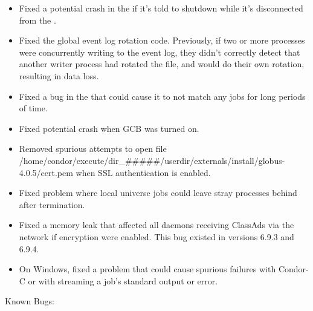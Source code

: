 \begin{itemize}
\item Fixed a potential crash in the  if it's told to
shutdown while it's disconnected from the .

\item Fixed the global event log rotation code.  Previously, if two or
  more processes were concurrently writing to the event log, they
  didn't correctly detect that another writer process had rotated the
  file, and would do their own rotation, resulting in data loss.

\item Fixed a bug in the  that could cause it to not match
any jobs for long periods of time.

\item Fixed potential crash when GCB was turned on.

\item Removed spurious attempts to open file
/home/condor/execute/dir\_\#\#\#\#\#/userdir/externals/install/globus-4.0.5/cert.pem
when SSL authentication is enabled.

\item Fixed problem where local universe jobs could leave stray processes behind
after termination.

\item Fixed a memory leak that affected all daemons receiving ClassAds via the
network if encryption were enabled. This bug existed in versions 6.9.3 and 6.9.4.

\item On Windows, fixed a problem that could cause spurious failures with Condor-C
or with streaming a job's standard output or error.
 
\end{itemize}

\noindent Known Bugs:

